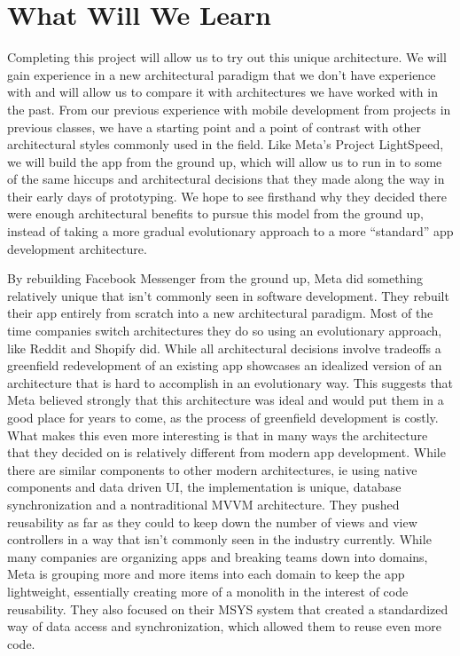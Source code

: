 \documentclass[12pt]{article}
\begin{document}
    \section{What Will We Learn}
    Completing this project will allow us to try out this unique architecture.
    We will gain experience in a new architectural paradigm that we don’t have experience with and will allow us to compare it with architectures we have worked with in the past.
    From our previous experience with mobile development from projects in previous classes, we have a starting point and a point of contrast with other architectural styles commonly used in the field.
    Like Meta's Project LightSpeed, we will build the app from the ground up, which will allow us to run in to some of the same hiccups and architectural decisions that they made along the way in their early days of prototyping.
    We hope to see firsthand why they decided there were enough architectural benefits to pursue this model from the ground up, instead of taking a more gradual evolutionary approach to a more “standard” app development architecture.

    By rebuilding Facebook Messenger from the ground up, Meta did something relatively unique that isn’t commonly seen in software development.
    They rebuilt their app entirely from scratch into a new architectural paradigm.
    Most of the time companies switch architectures they do so using an evolutionary approach, like Reddit and Shopify did.
    While all architectural decisions involve tradeoffs a greenfield redevelopment of an existing app showcases an idealized version of an architecture that is hard to accomplish in an evolutionary way.
    This suggests that Meta believed strongly that this architecture was ideal and would put them in a good place for years to come, as the process of greenfield development is costly.
    What makes this even more interesting is that in many ways the architecture that they decided on is relatively different from modern app development.
    While there are similar components to other modern architectures, ie using native components and data driven UI, the implementation is unique, database synchronization and a nontraditional MVVM architecture.
    They pushed reusability as far as they could to keep down the number of views and view controllers in a way that isn’t commonly seen in the industry currently.
    While many companies are organizing apps and breaking teams down into domains, Meta is grouping more and more items into each domain to keep the app lightweight, essentially creating more of a monolith in the interest of code reusability.
    They also focused on their MSYS system that created a standardized way of data access and synchronization, which allowed them to reuse even more code.


\end{document}
